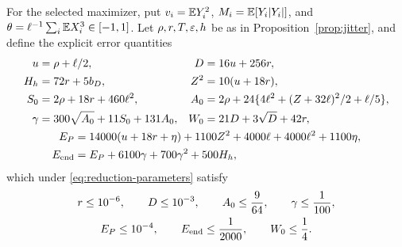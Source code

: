 For the selected maximizer, put $v_i=\mathbb E Y_i^2$, $M_i=\mathbb E[Y_i|Y_i|]$, and
$\theta=\ell^{-1}\sum_i\mathbb E X_i^3\in[-1,1]$. Let $\rho,r,T,\varepsilon,h$ be as in
Proposition~\ref{prop:jitter}, and define the explicit error quantities
\begin{equation}\label{eq:confinement-errors}
\begin{gathered}
\begin{aligned}
 u&=\rho+\ell/2,& D&=16u+256r,\\
 H_h&=72r+5b_D,& Z^2&=10(u+18r),\\
 S_0&=2\rho+18r+460\ell^2,&
 A_0&=2\rho+24\{4\ell^2+(Z+32\ell)^2/2+\ell/5\},\\
 \gamma&=300\sqrt{A_0}+11S_0+131A_0,&
 W_0&=21D+3\sqrt D+42r,
\end{aligned}\\
\begin{aligned}
 E_P&=14000(u+18r+\eta)+1100Z^2+4000\ell+4000\ell^2+1100\eta,\\
 E_{\rm end}&=E_P+6100\gamma+700\gamma^2+500H_h,
\end{aligned}
\end{gathered}
\end{equation}
which under \eqref{eq:reduction-parameters} satisfy
\begin{equation}\label{eq:confinement-gates}
 \begin{gathered}
 r\le10^{-6},\qquad D\le10^{-3},\qquad A_0\le\frac9{64},\qquad
 \gamma\le\frac1{100},\\
 E_P\le10^{-4},\qquad E_{\rm end}\le\frac1{2000},\qquad W_0\le\frac14.
 \end{gathered}
\end{equation}

